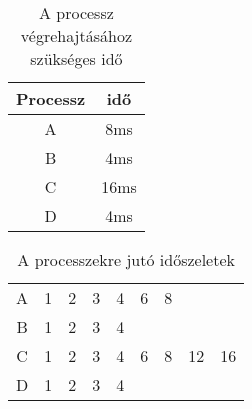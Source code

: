 





\begin{table}[h]
\centering
\caption{A processz végrehajtásához szükséges idő}
\label{tab:processtimes}
\begin{tabular}{|c|c|}
\hline
Processz & idő \\
\hline
A & 8ms \\
B & 4ms \\
C & 16ms \\
D & 4ms \\
\hline
\end{tabular}
\end{table}

\begin{table}[h]
\centering
\caption{A processzekre jutó időszeletek}
\label{tab:timeslices}
\begin{tabular}{|c|c|c|c|c|c|c|c|c|}
\hline
A & 1 & 2 & 3 & 4 & 6 & 8 & & \\
B & 1 & 2 & 3 & 4 & & & & \\
C & 1 & 2 & 3 & 4 & 6 & 8 & 12 & 16 \\
D & 1 & 2 & 3 & 4 & & & & \\
\hline
\end{tabular}
\end{table}
